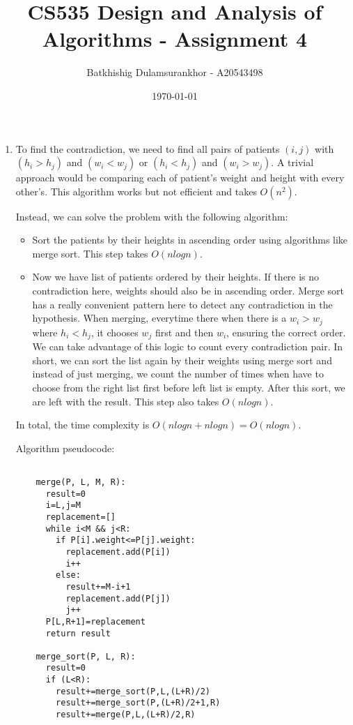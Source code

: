 \documentclass{article}
\title{CS535 Design and Analysis of Algorithms - Assignment 4}
\author{Batkhishig Dulamsurankhor - A20543498}
\date{\today} %
\begin{document}
\maketitle

\begin{enumerate}
  \item To find the contradiction, we need to find all pairs of patients $(i,j)$ with $(h_i>h_j)$ and $(w_i<w_j)$ or $(h_i<h_j)$ and $(w_i>w_j)$.
  A trivial approach would be comparing each of patient's weight and height with every other's.
  This algorithm works but not efficient and takes $O(n^2)$.
  
  Instead, we can solve the problem with the following algorithm:
  \begin{itemize}
    \item Sort the patients by their heights in ascending order using algorithms like merge sort. This step takes $O(nlogn)$.
    \item Now we have list of patients ordered by their heights.
    If there is no contradiction here, weights should also be in ascending order.
    Merge sort has a really convenient pattern here to detect any contradiction in the hypothesis.
    When merging, everytime there when there is a $w_i>w_j$ where $h_i<h_j$, it chooses $w_j$ first and then $w_i$, ensuring the correct order.
    We can take advantage of this logic to count every contradiction pair.
    In short, we can sort the list again by their weights using merge sort and instead of just merging, we count the number of times when have to choose from the right list first before left list is empty.
    After this sort, we are left with the result.
    This step also takes $O(nlogn)$.
  \end{itemize}

  In total, the time complexity is $O(nlogn+nlogn)=O(nlogn)$.

  Algorithm pseudocode:

  \begin{lstlisting}

    merge(P, L, M, R):
      result=0
      i=L,j=M
      replacement=[]
      while i<M && j<R:
        if P[i].weight<=P[j].weight:
          replacement.add(P[i])
          i++
        else:
          result+=M-i+1
          replacement.add(P[j])
          j++
      P[L,R+1]=replacement
      return result

    merge_sort(P, L, R):
      result=0
      if (L<R):
        result+=merge_sort(P,L,(L+R)/2)
        result+=merge_sort(P,(L+R)/2+1,R)
        result+=merge(P,L,(L+R)/2,R)


\end{lstlisting}
\end{enumerate}
\end{document}
